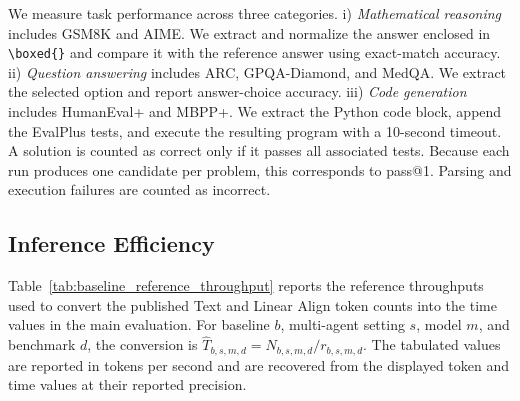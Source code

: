 \documentclass[11pt]{article}
\newcommand{\mingzhe}[1]{\textcolor{table_red}{#1}}
\begin{document}

We measure task performance across three categories. i) \textit{Mathematical reasoning} includes GSM8K and AIME. We extract and normalize the answer enclosed in \verb|\boxed{}| and compare it with the reference answer using exact-match accuracy. ii) \textit{Question answering} includes ARC, GPQA-Diamond, and MedQA. We extract the selected option and report answer-choice accuracy. iii) \textit{Code generation} includes HumanEval+ and MBPP+. We extract the Python code block, append the EvalPlus tests, and execute the resulting program with a 10-second timeout. A solution is counted as correct only if it passes all associated tests. Because each run produces one candidate per problem, this corresponds to pass@1. Parsing and execution failures are counted as incorrect.

\subsection{Inference Efficiency}
\label{app:inference_efficiency}

Table~\ref{tab:baseline_reference_throughput} reports the reference
throughputs used to convert the published Text and Linear Align token counts
into the time values in the main evaluation.  For baseline $b$, multi-agent
setting $s$, model $m$, and benchmark $d$, the conversion is
$\widehat{T}_{b,s,m,d}=N_{b,s,m,d}/r_{b,s,m,d}$.  The tabulated values are
reported in tokens per second and are recovered from the displayed token and
time values at their reported precision.
\end{document}
